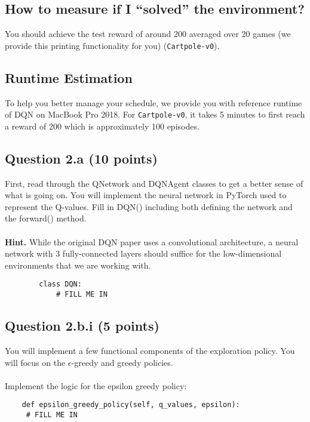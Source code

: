 \documentclass[12pt]{article}
\begin{document}
\subsection*{How to measure if I ``solved'' the environment?}
You should achieve the test reward of around 200 averaged over 20 games (we provide this printing functionality for you) (\texttt{Cartpole-v0}).

\subsection*{Runtime Estimation}
To help you better manage your schedule, we provide you with reference runtime of DQN on MacBook Pro 2018. For \texttt{Cartpole-v0}, it takes 5 minutes to first reach a reward of 200 which is approximately 100 episodes.

\subsection*{Question 2.a (10 points)}
First, read through the QNetwork and DQNAgent classes to get a better sense of what is going on. You will implement the neural network in PyTorch used to represent the Q-values. Fill in DQN() including both defining the network and the forward() method.
\\\\
\textbf{Hint.} While the original DQN paper uses a convolutional architecture, a neural network with 3 fully-connected layers should suffice for the low-dimensional environments that we are working with. 
\begin{solution}
    \begin{verbatim}
        class DQN:
            # FILL ME IN
    \end{verbatim}
\end{solution}

\subsection*{Question 2.b.i (5 points)} 
You will implement a few functional components of the exploration policy. You will focus on the $\epsilon$-greedy and greedy policies.
\\\\
Implement the logic for the epsilon greedy policy:
\begin{solution}
    \begin{verbatim}
    def epsilon_greedy_policy(self, q_values, epsilon):
     # FILL ME IN
    \end{verbatim}
\end{solution}
\end{document}

